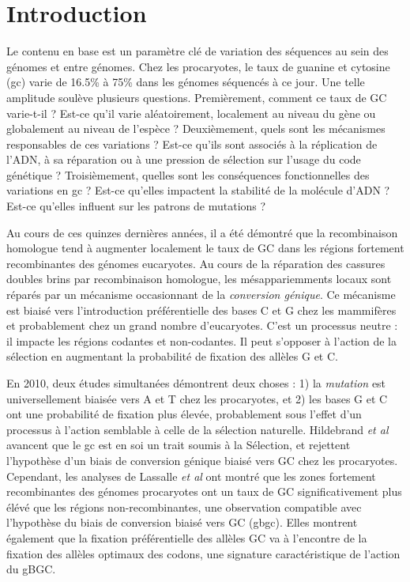 \section*{Introduction}
\label{sec:introduction}

Le contenu en base est un paramètre clé de variation des séquences au sein des
génomes et entre génomes. Chez les procaryotes, le taux de guanine et cytosine
(\ac{gc}) varie de 16.5\% à 75\% dans les génomes séquencés à ce jour. Une
telle amplitude soulève plusieurs questions. Premièrement, comment ce taux de
GC varie-t-il ? Est-ce qu'il varie aléatoirement, localement au niveau du gène
ou globalement au niveau de l'espèce ? Deuxièmement, quels sont les mécanismes
responsables de ces variations ? Est-ce qu'ils sont associés à la réplication
de l'ADN, à sa réparation ou à une pression de sélection sur l'usage du code
génétique ?  Troisièmement, quelles sont les conséquences fonctionnelles des
variations en \ac{gc} ? Est-ce qu'elles impactent la stabilité de la molécule
d'ADN ?  Est-ce qu'elles influent sur les patrons de mutations ?

Au cours de ces quinzes dernières années, il a été démontré que la recombinaison
homologue tend à augmenter localement le taux de GC dans les régions fortement
recombinantes des génomes
eucaryotes\cite{duret_biased_2009,lesecque_gc-biased_2013}. Au cours de la
réparation des cassures doubles brins par recombinaison homologue, les
mésappariemments locaux sont réparés par un mécanisme occasionnant de la
\emph{conversion génique}\cite{chen_gene_2007}. Ce mécanisme est biaisé vers
l'introduction préférentielle des bases C et G chez les mammifères et
probablement chez un grand nombre d'eucaryotes\cite{pessia_evidence_2012}. C'est
un processus neutre : il impacte les régions codantes et non-codantes. Il peut
s'opposer à l'action de la sélection en augmentant la probabilité de fixation
des allèles G et C\cite{ratnakumar_detecting_2010}.

En 2010, deux études simultanées\cite{hildebrand_evidence_2010,
	hershberg_evidence_2010} démontrent deux choses : 1) la \emph{mutation}
est universellement biaisée vers A et T chez les procaryotes, et 2) les bases G
et C ont une probabilité de fixation plus élevée, probablement sous l'effet
d'un processus à l'action semblable à celle de la sélection naturelle.
Hildebrand \emph{et al} avancent que le \ac{gc} est en soi un trait soumis à la
Sélection, et rejettent l'hypothèse d'un biais de conversion génique biaisé
vers GC chez les procaryotes. Cependant, les analyses de Lassalle \emph{et al}
\cite{lassalle_gc-content_2015} ont montré que les zones fortement
recombinantes des génomes procaryotes ont un taux de GC significativement plus
élévé que les régions non-recombinantes, une observation compatible avec
l'hypothèse du biais de conversion biaisé vers GC (\ac{gbgc}). Elles montrent
également que la fixation préférentielle des allèles GC va à l'encontre de la
fixation des allèles optimaux des codons, une signature caractéristique de
l'action du gBGC. %
